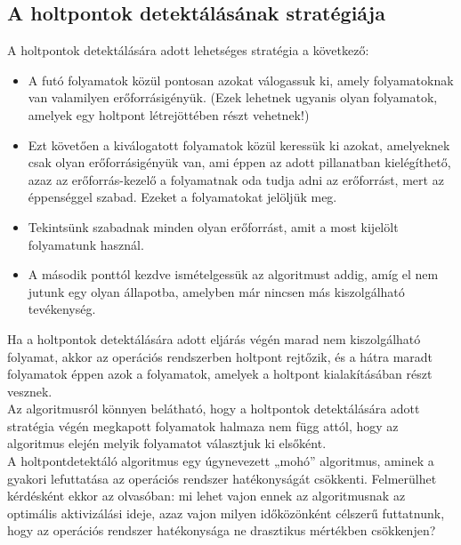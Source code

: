 \documentclass[tikz,12pt,margin=0px]{article}
\begin{document}
    \subsection*{A holtpontok detektálásának stratégiája }

    A holtpontok detektálására adott lehetséges stratégia a következő:

    \begin{itemize}[topsep=8pt,itemsep=4pt,partopsep=4pt, parsep=4pt]
        \item A futó folyamatok közül pontosan azokat válogassuk ki, amely folyamatoknak van valamilyen erőforrásigényük. (Ezek lehetnek ugyanis olyan folyamatok, amelyek egy holtpont létrejöttében részt vehetnek!)
        \item Ezt követően a kiválogatott folyamatok közül keressük ki azokat, amelyeknek csak olyan erőforrásigényük van, ami éppen az adott pillanatban kielégíthető, azaz az erőforrás-kezelő a folyamatnak oda tudja adni az erőforrást, mert az éppenséggel szabad. Ezeket a folyamatokat jelöljük meg.
        \item Tekintsünk szabadnak minden olyan erőforrást, amit a most kijelölt folyamatunk használ.
        \item A második ponttól kezdve ismételgessük az algoritmust addig, amíg el nem jutunk egy olyan állapotba, amelyben már nincsen más kiszolgálható tevékenység.
    \end{itemize}

    \noindent Ha a holtpontok detektálására adott eljárás végén marad nem kiszolgálható folyamat, akkor az operációs rendszerben holtpont rejtőzik, és a hátra maradt folyamatok éppen azok a folyamatok, amelyek a holtpont kialakításában részt vesznek.\\

    \noindent Az algoritmusról könnyen belátható, hogy a holtpontok detektálására adott stratégia végén megkapott folyamatok halmaza nem függ attól, hogy az algoritmus elején melyik folyamatot választjuk ki elsőként.\\

    \noindent A holtpontdetektáló algoritmus egy úgynevezett „mohó” algoritmus, aminek a gyakori lefuttatása az operációs rendszer hatékonyságát csökkenti. Felmerülhet kérdésként ekkor az olvasóban: mi lehet vajon ennek az algoritmusnak az optimális aktivizálási ideje, azaz vajon milyen időközönként célszerű futtatnunk, hogy az operációs rendszer hatékonysága ne drasztikus mértékben csökkenjen?\\
\end{document}
